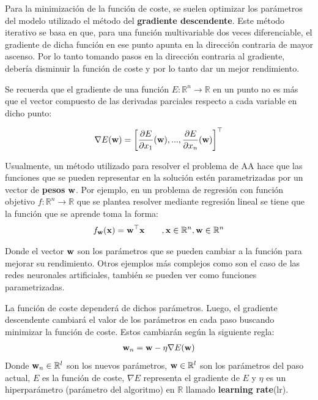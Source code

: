 Para la minimización de la función de coste, se suelen optimizar los parámetros del modelo utilizado el método del \textbf{gradiente descendente}. Este método iterativo se basa en que, para una función multivariable dos veces diferenciable, el gradiente de dicha función en ese punto apunta en la dirección contraria de mayor ascenso. Por lo tanto tomando pasos en la dirección contraria al gradiente, debería disminuir la función de coste y por lo tanto dar un mejor rendimiento.


Se recuerda que el gradiente de una función $E:\mathbb{R}^n \rightarrow \mathbb{R}$ en un punto no es más que el vector compuesto de las derivadas parciales respecto a cada variable en dicho punto:

\begin{align*}
\nabla E(\textnormal{\textbf{w}}) = \left[ \frac{\partial E}{\partial x_1}(\textnormal{\textbf{w}}),...,\frac{\partial E}{\partial x_n}(\textnormal{\textbf{w}}) \right]^\top
\end{align*}


Usualmente, un método utilizado para resolver el problema de AA hace que las funciones que se pueden representar en la solución estén parametrizadas por un vector de \textbf{pesos} $\textnormal{\textbf{w}}$. Por ejemplo, en un problema de regresión con función objetivo $f:\mathbb{R}^n \rightarrow \mathbb{R}$ que se plantea resolver mediante regresión lineal se tiene que la función que se aprende toma la forma: 
\begin{align*}
f_{\textnormal{\textbf{w}}}(\textnormal{\textbf{x}}) = \textnormal{\textbf{w}}^\top \textnormal{\textbf{x}} \quad \quad , \textnormal{\textbf{x}} \in \mathbb{R}^n, \textnormal{\textbf{w}} \in \mathbb{R}^n
\end{align*}
 
Donde el vector $\textnormal{\textbf{w}}$ son los parámetros que se pueden cambiar a la función para mejorar su rendimiento. Otros ejemplos más complejos como son el caso de las redes neuronales artificiales, también se pueden ver como funciones parametrizadas.

La función de coste dependerá de dichos parámetros. Luego, el gradiente descendente cambiará el valor de los parámetros en cada paso buscando minimizar la función de coste. Estos cambiarán según la siguiente regla:
\begin{align*}
\textnormal{\textbf{w}}_n = \textnormal{\textbf{w}} - \eta \nabla E(\textnormal{\textbf{w}})
\end{align*} 
Donde $\textnormal{\textbf{w}}_n\in\mathbb{R}^l$ son los nuevos parámetros, $\textnormal{\textbf{w}}\in\mathbb{R}^l$ son los parámetros del paso actual, $E$ es la función de coste, $\nabla E$ representa el gradiente de $E$ y $\eta$ es un hiperparámetro (parámetro del algoritmo) en $\mathbb{R}$ llamado \textbf{learning rate}(lr).

